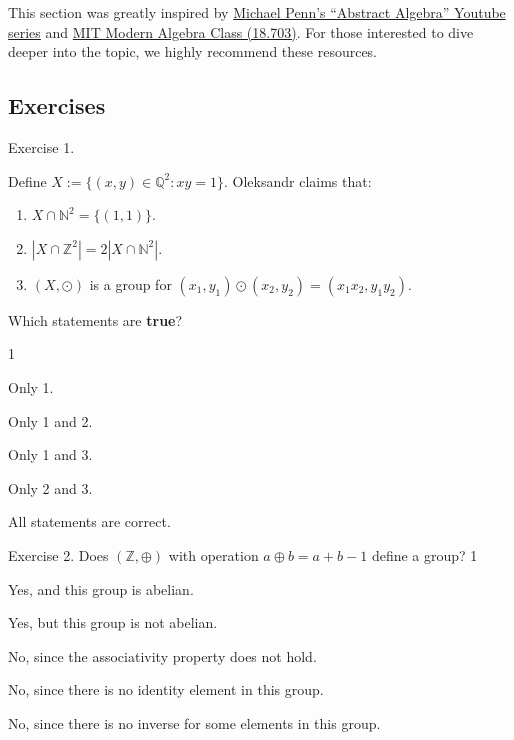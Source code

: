 \documentclass[../lecture-notes-148x210.tex]{subfiles}
\begin{document}
This section was greatly inspired by
\href{https://www.youtube.com/watch?v=j5nkkCp0ARw&list=PLVMgvCDIRy1y4JFpnpzEQZ0gRwr-sPTpw}{Michael
Penn's ``Abstract Algebra'' Youtube series} and
\href{https://ocw.mit.edu/courses/18-703-modern-algebra-spring-2013/}{MIT Modern
Algebra Class (18.703)}. For those interested to dive deeper into the topic, we
highly recommend these resources.

\subsection{Exercises}

\begin{xexercise}
    {Exercise 1.}
    {Define $X := \{(x,y) \in \mathbb{Q}^2: xy=1\}$. Oleksandr claims that:
    \begin{enumerate}
        \item $X \cap \mathbb{N}^2 = \{(1,1)\}$.
        \item $|X \cap \mathbb{Z}^2| = 2|X \cap \mathbb{N}^2|$.
        \item $(X,\odot)$ is a group for $(x_1,y_1)\odot (x_2,y_2) = (x_1x_2,y_1y_2)$.
    \end{enumerate}
    Which statements are \textbf{true}?
    }
    {1}
    {
        \item Only 1.
        \item Only 1 and 2.
        \item Only 1 and 3.
        \item Only 2 and 3.
        \item All statements are correct.
    }
\end{xexercise}

\begin{xexercise}
    {Exercise 2.}
    {Does $(\mathbb{Z},\oplus)$ with operation $a \oplus b = a + b - 1$ define a group?}
    {1}
    {
        \item Yes, and this group is abelian.
        \item Yes, but this group is not abelian.
        \item No, since the associativity property does not hold.
        \item No, since there is no identity element in this group.
        \item No, since there is no inverse for some elements in this group.
    }
\end{xexercise}
\end{document}
